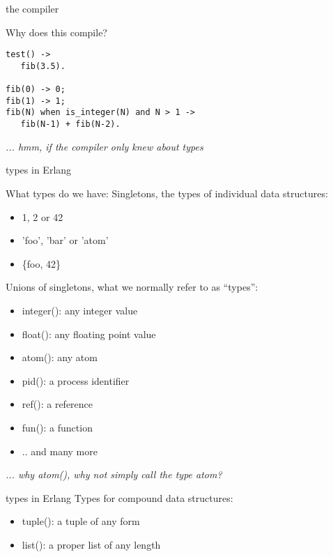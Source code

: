 \begin{frame}[fragile]{the compiler}

Why does this compile?

\begin{verbatim}
test() ->
   fib(3.5).

fib(0) -> 0;
fib(1) -> 1;
fib(N) when is_integer(N) and N > 1 -> 
   fib(N-1) + fib(N-2).
\end{verbatim}

\pause\vspace{20pt}
{\em ... hmm, if the compiler only knew about types}

\end{frame}

\begin{frame}{types in Erlang}

What types do we have:
\pause\vspace{10pt}
Singletons, the types of individual data structures:
\begin{itemize}
\item  1, 2 or 42
\item 'foo', 'bar' or 'atom'
\item  \{foo, 42\}
\end{itemize}
\pause\vspace{10pt}
Unions of singletons, what we normally refer to as ``types'':
\begin{itemize}
\item integer(): any integer value 
\item float(): any floating point value 
\item atom(): any atom 
\item pid(): a process identifier
\item ref(): a reference
\item fun(): a function 
\item .. and many more
\end{itemize}

{\em ... why atom(), why not simply call the type atom?}
\end{frame}

\begin{frame}{types in Erlang}
Types for compound data structures:
\pause\vspace{10pt}
\begin{itemize}
\item  tuple(): a tuple of any form
\item  list(): a proper list of any length
\end{itemize}

\end{frame}


